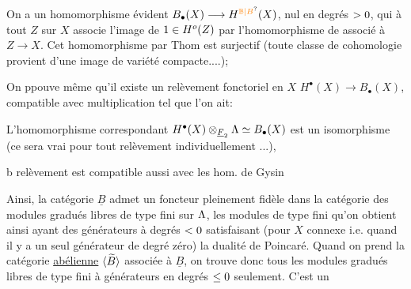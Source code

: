 On a un homomorphisme  évident $B_{\bullet}(X)\longrightarrow H^{\unsure{\mathbb B|B}}(X)$, nul en degrés $>0$, qui à tout $Z$ sur $X$ associe l'image de $1\in H^o(Z)$ par l'homomorphisme de  associé à $Z\longrightarrow X$. Cet homomorphisme par Thom est surjectif (toute classe de cohomologie provient d'une image de variété compacte....); 

On ppouve même qu'il existe un relèvement fonctoriel en $X$ $H^{\bullet}(X)\longrightarrow B_{\bullet}(X)$, \handwritten{(} compatible avec multiplication\handwritten{)} tel que l'on ait:

 L'homomorphisme correspondant $H^{\bullet}(X)\otimes_{\underline F_2}\Lambda\simeq B_{\bullet}(X)$ est un isomorphisme (ce sera vrai pour tout relèvement individuellement ...), 

b\handwritten{)} \handwritten{[}  relèvement est compatible aussi avec les hom. de Gysin

Ainsi, la catégorie $\underline B$ admet un foncteur pleinement fidèle dans la catégorie des modules gradués libres de type fini sur $\Lambda$, les modules de type fini qu'on obtient ainsi ayant des générateurs à degrés $<0$  satisfaisant (pour $X$ connexe i.e. quand il y a un seul générateur de degré zéro) la dualité de Poincaré. Quand on prend la catégorie \uline{ abélienne} $\inserted{\handwritten{\widetilde B}}$ associée à $\underline B$, on trouve donc tous les modules gradués libres de type fini à générateurs  en degrés $\leq0$ seulement. C'est un


